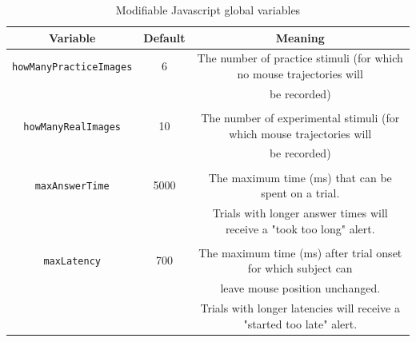 \documentclass[]{article}
\begin{document}
\begin{table}[h]
\caption{Modifiable Javascript global variables}
\label{tb:js_parameters}
\centering
\begin{tabular}{@{}ccc@{}}
\toprule
\textbf{Variable}             & \textbf{Default}      & \textbf{Meaning}                                      \\ \midrule
\texttt{howManyPracticeImages}         & 6    & The number of practice stimuli (for which no mouse trajectories will \\&&be recorded)                               \\ \\
\texttt{howManyRealImages}               & 10 & The number of experimental stimuli (for which mouse trajectories will \\&&be recorded)                               \\ \\
\texttt{maxAnswerTime}       & 5000    & The maximum time (ms) that can be spent on a trial. \\&&Trials with longer answer times will receive a "took too long" alert.                                                                   \\ \\
\texttt{maxLatency}              & 700 & The maximum time (ms) after trial onset for which subject can \\&&leave mouse position unchanged. \\&&Trials with longer latencies will receive a "started too late" alert. \\
\bottomrule
\end{tabular}
\end{table}
\end{document}
